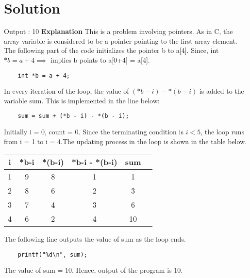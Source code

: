 \documentclass[journal,12pt,twocolumn]{IEEEtran}
\begin{document}
\section{Solution}
Output : 10
\newline
\textbf{Explanation}
\newline
This is a problem involving pointers. As in C, the array variable is considered to be a pointer pointing to the first array element. The following part of the code initializes the pointer b to a[4]. Since, int $*b = a+4 \implies$ implies b points to a[0+4] = a[4].
\begin{lstlisting}
    int *b = a + 4;
\end{lstlisting}
In every iteration of the loop, the value of $(*b-i) - *(b-i)$ is added to the variable sum. This is implemented in the line below:
\begin{lstlisting}
    sum = sum + (*b - i) - *(b - i);
\end{lstlisting}
Initially i = 0, count = 0. Since the terminating condition is $i<5$, the loop runs from i = 1 to i = 4.The updating process in the loop is shown in the table below.
\begin{table}[ht]
        \centering
        \begin{tabular}{|c|c|c|c|c|c|}
        \hline
        i & *b-i & *(b-i) & *b-i - *(b-i) & sum \\
        \hline
        1 & 9 & 8 & 1 & 1\\
        \hline
        2 & 8 & 6 & 2 & 3\\
        \hline
        3 & 7 & 4 & 3 & 6\\
        \hline
        4 & 6 & 2 & 4 & 10\\
        \hline        
        \end{tabular}
\end{table}
The following line outputs the value of sum as the loop ends. 
\begin{lstlisting}
    printf("%d\n", sum);
\end{lstlisting}
The value of sum = 10. Hence, output of the program is 10.
\end{document}
